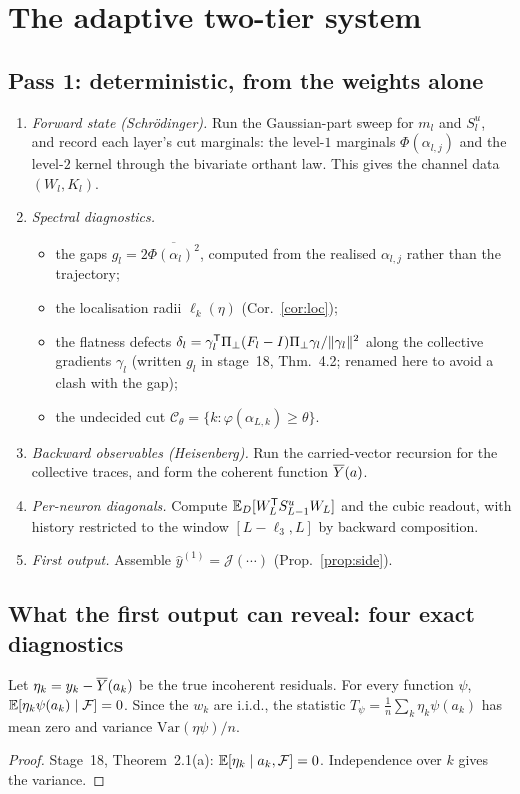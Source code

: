 \section{The adaptive two-tier system}\label{sec:adaptive}
\subsection{Pass 1: deterministic, from the weights alone}
\begin{enumerate}[label=\arabic*.,leftmargin=1.6em,itemsep=1pt,topsep=1pt]
\item \emph{Forward state (Schr\"odinger).} Run the Gaussian-part sweep for $m_l$ and $S^u_l$, and record each
layer's cut marginals: the level-$1$ marginals $\Phi(\alpha_{l,j})$ and the level-$2$ kernel through the
bivariate orthant law. This gives the channel data $(W_l,K_l)$.
\item \emph{Spectral diagnostics.}
\begin{itemize}[leftmargin=1.2em,itemsep=0pt,topsep=1pt]
\item the gaps $g_l=2\overline{\Phi(\alpha_l)^2}$, computed from the realised $\alpha_{l,j}$ rather than the trajectory;
\item the localisation radii $\ell_k(\eta)$ (Cor.~\ref{cor:loc});
\item the flatness defects $\delta_l=\gamma_l^{\mathsf T}\Pi_\perp(F_l-I)\Pi_\perp\gamma_l/\|\gamma_l\|^2$ along the collective gradients $\gamma_l$
(written $g_l$ in stage~18, Thm.~4.2; renamed here to avoid a clash with the gap);
\item the undecided cut $\mathcal C_\theta=\{k:\varphi(\alpha_{L,k})\ge\theta\}$.
\end{itemize}
\item \emph{Backward observables (Heisenberg).} Run the carried-vector recursion for the collective traces,
and form the coherent function $\overline{Y}(a)$.
\item \emph{Per-neuron diagonals.} Compute $\mathbb E_D[W_L^{\mathsf T} S^u_{L-1}W_L]$ and the cubic readout, with history
restricted to the window $[L-\ell_3,L]$ by backward composition.
\item \emph{First output.} Assemble $\hat y^{(1)}=\mathcal J(\cdots)$ (Prop.~\ref{prop:side}).
\end{enumerate}

\subsection{What the first output can reveal: four exact diagnostics}
\begin{proposition}\label{prop:wo}
Let $\eta_k=y_k-\overline{Y}(a_k)$ be the true incoherent residuals. For every function $\psi$,
$\mathbb{E}[\eta_k\psi(a_k)\mid\mathcal F]=0$. Since the $w_k$ are i.i.d., the statistic $T_\psi=\frac1n\sum_k\eta_k\psi(a_k)$ has mean zero and
variance $\mathrm{Var}(\eta\psi)/n$.
\end{proposition}
\begin{proof}
Stage~18, Theorem~2.1(a): $\mathbb{E}[\eta_k\mid a_k,\mathcal F]=0$. Independence over $k$ gives the variance.
\end{proof}

